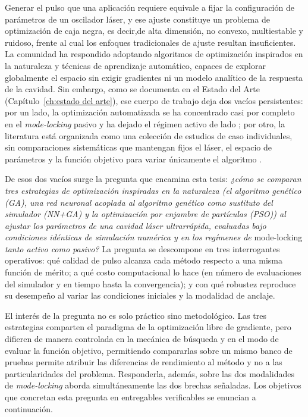 Generar el pulso que una aplicación requiere equivale a fijar la configuración de parámetros de un oscilador láser, y ese ajuste constituye un problema de optimización de caja negra, es decir,de alta dimensión, no convexo, multiestable y ruidoso, frente al cual los enfoques tradicionales de ajuste resultan insuficientes. La comunidad ha respondido adoptando algoritmos de optimización inspirados en la naturaleza y técnicas de aprendizaje automático, capaces de explorar globalmente el espacio sin exigir gradientes ni un modelo analítico de la respuesta de la cavidad. Sin embargo, como se documenta en el Estado del Arte (Capítulo~\ref{ch:estado del arte}), ese cuerpo de trabajo deja dos vacíos persistentes: por un lado, la optimización automatizada se ha concentrado casi por completo en el \emph{mode-locking} pasivo y ha dejado el régimen activo de lado \cite{KuizengaSiegman1970}; por otro, la literatura está organizada como una colección de estudios de caso individuales, sin comparaciones sistemáticas que mantengan fijos el láser, el espacio de parámetros y la función objetivo para variar únicamente el algoritmo \cite{Genty2021,Jiang2022}.
 
De esos dos vacíos surge la pregunta que encamina esta tesis: \emph{¿cómo se comparan tres estrategias de optimización inspiradas en la naturaleza (el algoritmo genético (GA), una red neuronal acoplada al algoritmo genético como sustituto del simulador (NN+GA) y la optimización por enjambre de partículas (PSO)) al ajustar los parámetros de una cavidad láser ultrarrápida, evaluadas bajo condiciones idénticas de simulación numérica y en los regímenes de} mode-locking \emph{tanto activo como pasivo?} La pregunta se descompone en tres interrogantes operativos: qué calidad de pulso alcanza cada método respecto a una misma función de mérito; a qué costo computacional lo hace (en número de evaluaciones del simulador y en tiempo hasta la convergencia); y con qué robustez reproduce su desempeño al variar las condiciones iniciales y la modalidad de anclaje.
 
El interés de la pregunta no es solo práctico sino metodológico. Las tres estrategias comparten el paradigma de la optimización libre de gradiente, pero difieren de manera controlada en la mecánica de búsqueda y en el modo de evaluar la función objetivo, permitiendo compararlas sobre un mismo banco de pruebas permite atribuir las diferencias de rendimiento al método y no a las particularidades del problema. Responderla, además, sobre las dos modalidades de \emph{mode-locking} aborda simultáneamente las dos brechas señaladas. Los objetivos que concretan esta pregunta en entregables verificables se enuncian a continuación.


